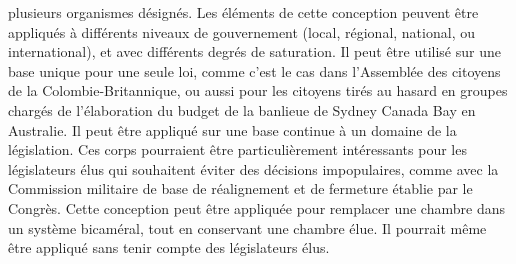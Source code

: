 plusieurs organismes désignés. Les éléments de cette conception
peuvent être appliqués à différents niveaux de gouvernement (local,
régional, national, ou international), et avec différents degrés de
saturation. Il peut être utilisé sur une base unique pour une seule
loi, comme c'est le cas dans l'Assemblée des citoyens de la
Colombie-Britannique, ou aussi pour les citoyens tirés au hasard en
groupes chargés de l'élaboration du budget de la banlieue de Sydney
Canada Bay en Australie. Il peut être appliqué sur une base continue à
un domaine de la législation. Ces corps pourraient être particulièrement
intéressants pour les législateurs élus qui souhaitent éviter des
décisions impopulaires, comme avec la Commission militaire de base
de réalignement et de fermeture établie par le Congrès. Cette
conception peut être appliquée pour remplacer une chambre dans un
système bicaméral, tout en conservant une chambre élue. Il pourrait
même être appliqué sans tenir compte des législateurs élus.\par















